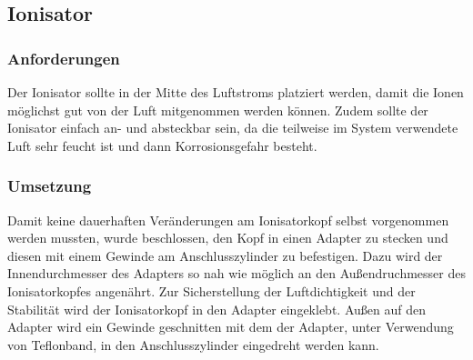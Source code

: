 \subsection{Ionisator}

\subsubsection{Anforderungen}

Der Ionisator sollte in der Mitte des Luftstroms platziert werden, damit die Ionen möglichst gut von der Luft mitgenommen werden können. Zudem sollte der Ionisator einfach an- und absteckbar sein, da die teilweise im System verwendete Luft sehr feucht ist und dann Korrosionsgefahr besteht.

\subsubsection{Umsetzung}

Damit keine dauerhaften Veränderungen am Ionisatorkopf selbst vorgenommen werden mussten, wurde beschlossen, den Kopf in einen Adapter zu stecken und diesen mit einem Gewinde am Anschlusszylinder zu befestigen. Dazu wird der Innendurchmesser des Adapters so nah wie möglich an den Außendruchmesser des Ionisatorkopfes angenährt. Zur Sicherstellung der Luftdichtigkeit und der Stabilität wird der Ionisatorkopf in den Adapter eingeklebt. Außen auf den Adapter wird ein Gewinde geschnitten mit dem der Adapter, unter Verwendung von Teflonband, in den Anschlusszylinder eingedreht werden kann.


